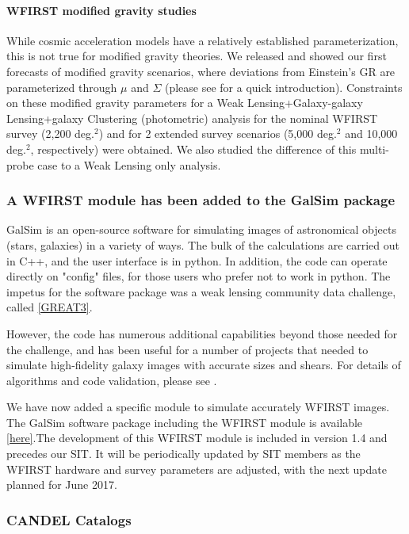 \paragraph{WFIRST modified gravity studies} While cosmic acceleration models have a relatively established parameterization, this is not true for modified gravity theories. We released and showed our first forecasts of modified gravity scenarios, where deviations from Einstein’s GR are parameterized through $\mu$ and $\Sigma$ (please see \citet{Joyce:2016vqv} for a quick introduction). Constraints on these modified gravity parameters for a Weak Lensing+Galaxy-galaxy Lensing+galaxy Clustering (photometric) analysis for the nominal WFIRST survey (2,200 deg.$^2$) and for 2 extended survey scenarios (5,000 deg.$^2$ and 10,000 deg.$^2$, respectively) were obtained. We also studied the difference of this multi-probe case to a Weak Lensing only analysis.

\subsubsection{A WFIRST module has been added to the GalSim package}

GalSim is an open-source software for simulating images of astronomical objects (stars, galaxies) in a variety of ways. The bulk of the calculations are carried out in C++, and the user interface is in python. In addition, the code can operate directly on "config" files, for those users who prefer not to work in python. The impetus for the software package was a weak lensing community data challenge, called \href{http://great3challenge.info/}{[GREAT3]}.

However, the code has numerous additional capabilities beyond those needed for the challenge, and has been useful for a number of projects that needed to simulate high-fidelity galaxy images with accurate sizes and shears. For details of algorithms and code validation, please see \citet{Rowe:2015}.

We have now added a specific module to simulate accurately WFIRST images. The GalSim software package including the WFIRST module is available \href{https://github.com/GalSim-developers/GalSim}{[here]}.The development of this WFIRST module is included in version 1.4 and precedes our SIT. It will be periodically updated by SIT members as the WFIRST hardware and survey parameters are adjusted, with the next update planned for June 2017.

\subsubsection{CANDEL Catalogs}


